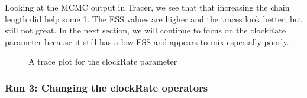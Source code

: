 \documentclass[11pt]{article}
\begin{document}
Looking at the MCMC output in Tracer, we see that that increasing the chain length did help some \ref{fig:tracer_run2}. The ESS values are higher and the traces look better, but still not great. In the next section, we will continue to focus on the clockRate parameter because it still has a low ESS and appears to mix especially poorly. 

\begin{figure}[!h]
\centering
{}
\caption{\small A trace plot for the clockRate parameter}
\label{fig:tracer_run2}
\end{figure}

\bigskip
\subsubsection{Run 3: Changing the clockRate operators}
\end{document}
